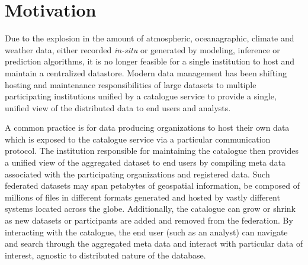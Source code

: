\section{Motivation}
\label{sec:motivation}
Due to the explosion in the amount of atmospheric, oceanagraphic,
climate and weather data, either recorded \emph{in-situ} or generated
by modeling, inference or prediction algorithms, it is no longer
feasible for a single institution to host and maintain a centralized
datastore. Modern data management has been shifting hosting and
maintenance responsibilities of large datasets to multiple
participating institutions unified by a catalogue service to provide a
single, unified view of the distributed data to end users and analysts.

A common practice is for data producing organizations to host their
own data which is exposed to the catalogue service via a particular
communication protocol. The institution responsible for maintaining
the catalogue then provides a unified view of the aggregated dataset
to end users by compiling meta data associated with the participating
organizations and registered data. Such federated datasets may
span petabytes of geospatial information, be composed of millions of
files in different formats generated and hosted by vastly
different systems located across the globe. Additionally, the
catalogue can grow or shrink as new datasets or participants are added
and removed from the federation. By interacting with the catalogue,
the end user (such as an analyst) can navigate and search through the
aggregated meta data and interact with particular data of
interest, agnostic to distributed nature of the database.

